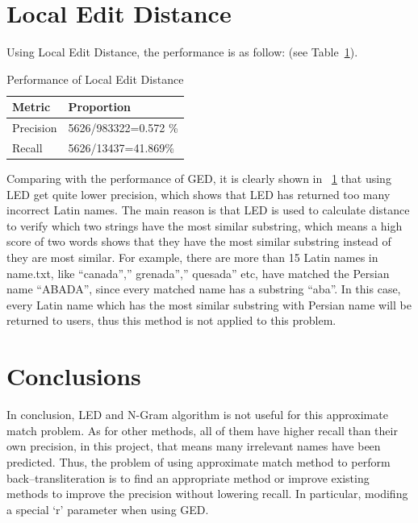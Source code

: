 \documentclass[11pt]{article}
\begin{document}


\section{Local Edit Distance}
Using Local Edit Distance, the performance is as follow: (see Table~\ref{table5}).

\begin{table}[h]
\begin{center}
\begin{tabular}{|l|l|}

      \hline
      Metric & Proportion\\
      \hline\hline
      Precision & 5626/983322=0.572 \%\\
      Recall & 5626/13437=41.869\%\\
      \hline

\end{tabular}
\caption{Performance of Local Edit Distance}\label{table5}
 \end{center}
\end{table}

Comparing with the performance of GED, it is clearly shown in ~\ref{table5} that using LED get quite lower precision, which shows that LED has returned too many incorrect Latin names. The main reason is that LED is used to calculate distance to verify which two strings have the most similar substring, which means a high score of two words shows that they have the most similar substring instead of they are most similar. For example, there are more than 15 Latin names in name.txt, like “canada”,” grenada”,” quesada” etc, have matched the Persian name “ABADA”, since every matched name has a substring “aba”. In this case, every Latin name which has the most similar substring with Persian name will be returned to users, thus this method is not applied to this problem.





\section{Conclusions}

In conclusion, LED and N-Gram algorithm is not useful for this approximate match problem. As for other methods, all of them have higher recall than their own precision, in this project, that means many irrelevant names have been predicted. Thus, the problem of using approximate match method to perform back–transliteration is to find an appropriate method or improve existing methods to improve the precision without lowering recall. In particular, modifing a special ‘r’ parameter when using GED.



\end{document}

